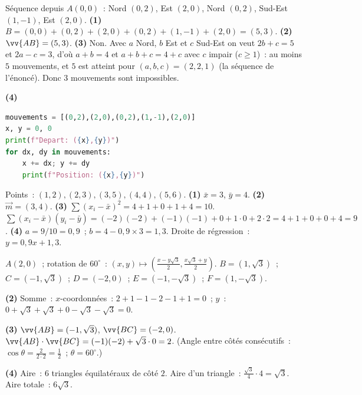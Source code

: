 
S\'equence depuis $A(0,0)$~: Nord $(0,2)$, Est $(2,0)$, Nord $(0,2)$, Sud-Est $(1,-1)$, Est $(2,0)$.
\textbf{(1)} $B=(0,0)+(0,2)+(2,0)+(0,2)+(1,-1)+(2,0)=(5,3)$.
\textbf{(2)} $\vv{AB}=(5,3)$.
\textbf{(3)} Non. Avec $a$ Nord, $b$ Est et $c$ Sud-Est on veut $2b+c=5$ et $2a-c=3$, d'o\`u $a+b=4$ et $a+b+c=4+c$ avec $c$ impair ($c\ge1$)~:
au moins $5$ mouvements, et $5$ est atteint pour $(a,b,c)=(2,2,1)$ (la s\'equence de l'\'enonc\'e). Donc $3$ mouvements sont impossibles.

\textbf{(4)}
\begin{lstlisting}[language=Python]
mouvements = [(0,2),(2,0),(0,2),(1,-1),(2,0)]
x, y = 0, 0
print(f"Depart: ({x},{y})")
for dx, dy in mouvements:
    x += dx; y += dy
    print(f"Position: ({x},{y})")
\end{lstlisting}


Points~: $(1,2),(2,3),(3,5),(4,4),(5,6)$.
\textbf{(1)} $\bar{x}=3$, $\bar{y}=4$.
\textbf{(2)} $\vec{m}=(3,4)$.
\textbf{(3)} $\sum(x_i-\bar{x})^2=4+1+0+1+4=10$.
$\sum(x_i-\bar{x})(y_i-\bar{y})=(-2)(-2)+(-1)(-1)+0+1\cdot0+2\cdot2=4+1+0+0+4=9$.
\textbf{(4)} $a=9/10=0{,}9$~; $b=4-0{,}9\times3=1{,}3$.
Droite de r\'egression~: $y=0{,}9x+1{,}3$.


$A(2,0)$~; rotation de $60^{\circ}$~: $(x,y)\mapsto(\frac{x-y\sqrt{3}}{2},\frac{x\sqrt{3}+y}{2})$.
$B=(1,\sqrt{3})$~; $C=(-1,\sqrt{3})$~; $D=(-2,0)$~; $E=(-1,-\sqrt{3})$~; $F=(1,-\sqrt{3})$.

\textbf{(2)} Somme~: $x$-coordonn\'ees~: $2+1-1-2-1+1=0$~; $y$~: $0+\sqrt{3}+\sqrt{3}+0-\sqrt{3}-\sqrt{3}=0$.\checkmark

\textbf{(3)} $\vv{AB}=(-1,\sqrt{3})$, $\vv{BC}=(-2,0)$.
$\vv{AB}\cdot\vv{BC}=(-1)(-2)+\sqrt{3}\cdot0=2$.
(Angle entre c\^ot\'es cons\'ecutifs~: $\cos\theta=\frac{2}{2\cdot2}=\frac{1}{2}$~; $\theta=60^{\circ}$.)

\textbf{(4)} Aire~: 6 triangles \'equilat\'eraux de c\^ot\'e $2$.
Aire d'un triangle~: $\frac{\sqrt{3}}{4}\cdot4=\sqrt{3}$.
Aire totale~: $6\sqrt{3}$.


